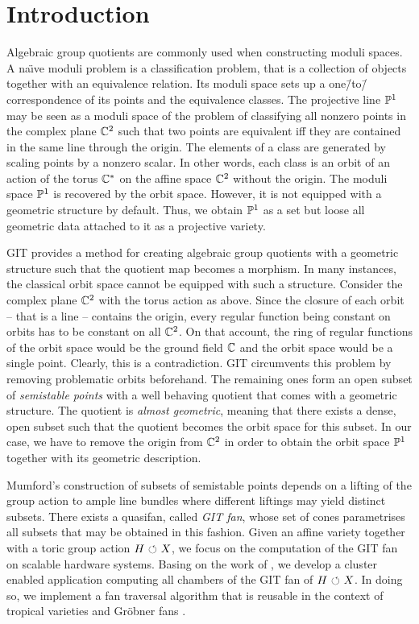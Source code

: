 \chapter{Introduction}

Algebraic group quotients are commonly used when constructing moduli spaces. A na\"{\i}ve moduli problem is a classification problem, that is a collection of objects together with an equivalence relation. Its moduli space sets up a one\=/to\=/correspondence of its points and the equivalence classes. The projective line $\mathbb{P}^1$ may be seen as a moduli space of the problem of classifying all nonzero points in the complex plane $\mathbb{C}^2$ such that two points are equivalent iff they are contained in the same line through the origin. The elements of a class are generated by scaling points by a nonzero scalar. In other words, each class is an orbit of an action of the torus $\mathbb{C}^*$ on the affine space $\mathbb{C}^2$ without the origin. The moduli space $\mathbb{P}^1$ is recovered by the orbit space. However, it is not equipped with a geometric structure by default. Thus, we obtain $\mathbb{P}^1$ as a set but loose all geometric data attached to it as a projective variety. 

\ac{GIT} provides a method for creating algebraic group quotients with a geometric structure such that the quotient map becomes a morphism. In many instances, the classical orbit space cannot be equipped with such a structure. Consider the complex plane $\mathbb{C}^2$ with the torus action as above. Since the closure of each orbit -- that is a line -- contains the origin, every regular function being constant on orbits has to be constant on all $\mathbb{C}^2$. On that account, the ring of regular functions of the orbit space would be the ground field $\mathbb{C}$ and the orbit space would be a single point. Clearly, this is a contradiction. \ac{GIT} circumvents this problem by removing problematic orbits beforehand. The remaining ones form an open subset of \emph{semistable points} with a well behaving quotient that comes with a geometric structure. The quotient is \emph{almost geometric}, meaning that there exists a dense, open subset such that the quotient becomes the orbit space for this subset. In our case, we have to remove the origin from $\mathbb{C}^2$ in order to obtain the orbit space $\mathbb{P}^1$ together with its geometric description.

Mumford's construction of subsets of semistable points depends on a lifting of the group action to ample line bundles where different liftings may yield distinct subsets. There exists a quasifan, called \emph{GIT fan}, whose set of cones parametrises all subsets that may be obtained in this fashion. Given an affine variety together with a toric group action $H{\ \circlearrowleft\ } X$, we focus on the computation of the GIT fan on scalable hardware systems. Basing on the work of \citeauthor{gitfan_symmetry} \cite{gitfan_symmetry}, we develop a cluster enabled application computing all chambers of the GIT fan of $H{\ \circlearrowleft\ } X$. In doing so, we implement a fan traversal algorithm that is reusable in the context of tropical varieties \cite{tropical_varities} and Gröbner fans \cite[chapter 3]{sturmfels}.

